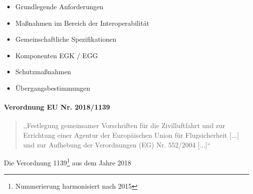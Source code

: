     \begin{itemize}
        \item Grundlegende Anforderungen
        \item Maßnahmen im Bereich der Interoperabilität
        \item Gemeinschaftliche Spezifikationen
        \item Komponenten EGK / EGG
        \item Schutzmaßnahmen
        \item Übergangsbestimmungen
    \end{itemize}

\paragraph{Verordnung EU Nr. 2018/1139}

\begin{quote}
    ,,Festlegung gemeinsamer Vorschriften für die Zivilluftfahrt und zur Errichtung einer Agentur der Europäischen Union für Flugsicherheit [...] und zur Aufhebung der Verordnungen (EG) Nr. 552/2004 [...]`` \cite{2018R1139} 
\end{quote}

Die Verordnung 1139\footnote{Nummerierung harmonisiert nach 2015\cite{eu_number_harmony}} aus dem Jahre 2018 


    \pagebreak
